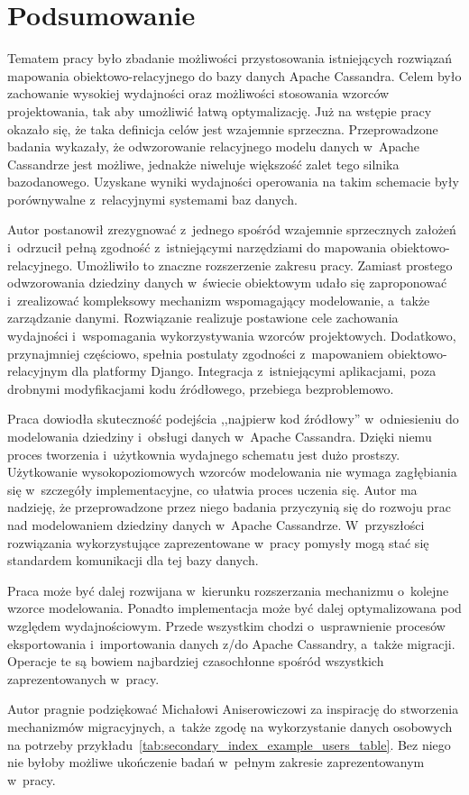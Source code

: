 
\chapter{Podsumowanie}

Tematem pracy było zbadanie możliwości przystosowania istniejących rozwiązań mapowania obiektowo-relacyjnego do bazy danych Apache Cassandra. Celem było zachowanie wysokiej wydajności oraz możliwości stosowania wzorców projektowania, tak aby umożliwić łatwą optymalizację. Już na wstępie pracy okazało się, że taka definicja celów jest wzajemnie sprzeczna. Przeprowadzone badania wykazały, że odwzorowanie relacyjnego modelu danych w~Apache Cassandrze jest możliwe, jednakże niweluje większość zalet tego silnika bazodanowego. Uzyskane wyniki wydajności operowania na takim schemacie były porównywalne z~relacyjnymi systemami baz danych.

Autor postanowił zrezygnować z~jednego spośród wzajemnie sprzecznych założeń i~odrzucił pełną zgodność z~istniejącymi narzędziami do mapowania obiektowo-relacyjnego. Umożliwiło to znaczne rozszerzenie zakresu pracy. Zamiast prostego odwzorowania dziedziny danych w~świecie obiektowym udało się zaproponować i~zrealizować kompleksowy mechanizm wspomagający modelowanie, a~także zarządzanie danymi. Rozwiązanie realizuje postawione cele zachowania wydajności i~wspomagania wykorzystywania wzorców projektowych. Dodatkowo, przynajmniej częściowo, spełnia postulaty zgodności z~mapowaniem obiektowo-relacyjnym dla platformy Django. Integracja z~istniejącymi aplikacjami, poza drobnymi modyfikacjami kodu źródłowego, przebiega bezproblemowo.

Praca dowiodła skuteczność podejścia ,,najpierw kod źródłowy'' w~odniesieniu do modelowania dziedziny i~obsługi danych w~Apache Cassandra. Dzięki niemu proces tworzenia i~użytkownia wydajnego schematu jest dużo prostszy. Użytkowanie wysokopoziomowych wzorców modelowania nie wymaga zagłębiania się w~szczegóły implementacyjne, co ułatwia proces uczenia się. Autor ma nadzieję, że przeprowadzone przez niego badania przyczynią się do rozwoju prac nad modelowaniem dziedziny danych w~Apache Cassandrze. W~przyszłości rozwiązania wykorzystujące zaprezentowane w~pracy pomysły mogą stać się standardem komunikacji dla tej bazy danych.

Praca może być dalej rozwijana w~kierunku rozszerzania mechanizmu o~kolejne wzorce modelowania. Ponadto implementacja może być dalej optymalizowana pod względem wydajnościowym. Przede wszystkim chodzi o~usprawnienie procesów eksportowania i~importowania danych z/do Apache Cassandry, a~także migracji. Operacje te są bowiem najbardziej czasochłonne spośród wszystkich zaprezentowanych w~pracy.

Autor pragnie podziękować Michałowi Aniserowiczowi za inspirację do stworzenia mechanizmów migracyjnych, a~także zgodę na wykorzystanie danych osobowych na potrzeby przykładu~\ref{tab:secondary_index_example_users_table}. Bez niego nie byłoby możliwe ukończenie badań w~pełnym zakresie zaprezentowanym w~pracy.
